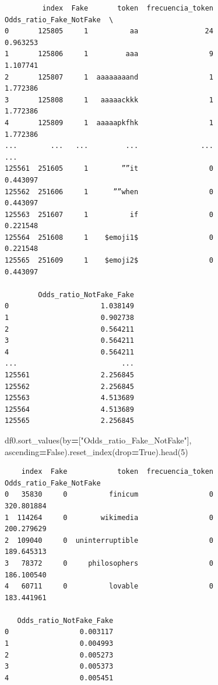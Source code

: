 \documentclass[
  11pt,
  a4paper,
]{article}
\newenvironment{Shaded}{\begin{snugshade}}{\end{snugshade}}
\newcommand{\DecValTok}[1]{\textcolor[rgb]{0.00,0.00,0.81}{#1}}
\newcommand{\NormalTok}[1]{#1}
\newcommand{\OperatorTok}[1]{\textcolor[rgb]{0.81,0.36,0.00}{\textbf{#1}}}
\newcommand{\StringTok}[1]{\textcolor[rgb]{0.31,0.60,0.02}{#1}}
\newcommand{\VariableTok}[1]{\textcolor[rgb]{0.00,0.00,0.00}{#1}}
\begin{document}
\begin{verbatim}
         index  Fake       token  frecuencia_token  Odds_ratio_Fake_NotFake  \
0       125805     1          aa                24                 0.963253   
1       125806     1         aaa                 9                 1.107741   
2       125807     1  aaaaaaaand                 1                 1.772386   
3       125808     1   aaaaackkk                 1                 1.772386   
4       125809     1  aaaaapkfhk                 1                 1.772386   
...        ...   ...         ...               ...                      ...   
125561  251605     1        ””it                 0                 0.443097   
125562  251606     1      ””when                 0                 0.443097   
125563  251607     1          if                 0                 0.221548   
125564  251608     1    $emoji1$                 0                 0.221548   
125565  251609     1    $emoji2$                 0                 0.443097   

        Odds_ratio_NotFake_Fake  
0                      1.038149  
1                      0.902738  
2                      0.564211  
3                      0.564211  
4                      0.564211  
...                         ...  
125561                 2.256845  
125562                 2.256845  
125563                 4.513689  
125564                 4.513689  
125565                 2.256845  
\end{verbatim}

\begin{Shaded}
\begin{Highlighting}[]
\NormalTok{df0.sort\_values(by}\OperatorTok{=}\NormalTok{[}\StringTok{"Odds\_ratio\_Fake\_NotFake"}\NormalTok{], ascending}\OperatorTok{=}\VariableTok{False}\NormalTok{).reset\_index(drop}\OperatorTok{=}\VariableTok{True}\NormalTok{).head(}\DecValTok{5}\NormalTok{)}
\end{Highlighting}
\end{Shaded}

\begin{verbatim}
    index  Fake            token  frecuencia_token  Odds_ratio_Fake_NotFake  
0   35830     0          finicum                 0               320.801884   
1  114264     0        wikimedia                 0               200.279629   
2  109040     0  uninterruptible                 0               189.645313   
3   78372     0     philosophers                 0               186.100540   
4   60711     0          lovable                 0               183.441961   

   Odds_ratio_NotFake_Fake  
0                 0.003117  
1                 0.004993  
2                 0.005273  
3                 0.005373  
4                 0.005451
\end{verbatim}
\end{document}
